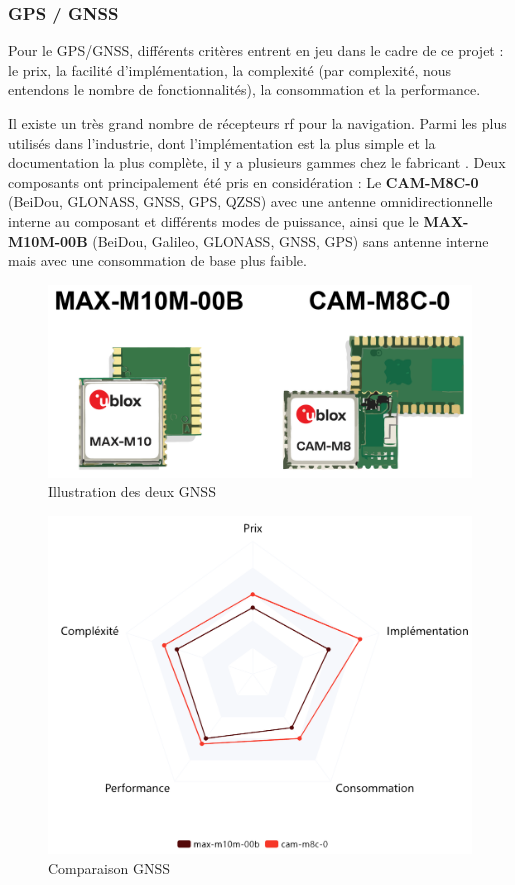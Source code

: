 \clearpage

\subsubsection{GPS / GNSS}
Pour le \gls{GPS}/\gls{GNSS}, différents critères entrent en jeu dans le cadre de ce projet : le prix, la facilité d'implémentation, la complexité (par complexité, nous entendons le nombre de fonctionnalités), la consommation et la performance.

Il existe un très grand nombre de récepteurs \gls{rf} pour la navigation. Parmi les plus utilisés dans l'industrie, dont l'implémentation est la plus simple et la documentation la plus complète, il y a plusieurs gammes chez le fabricant .
Deux composants ont principalement été pris en considération :
Le \textbf{CAM-M8C-0} (BeiDou, GLONASS, GNSS, GPS, QZSS) avec une antenne omnidirectionnelle interne au composant et différents modes de puissance, ainsi que le \textbf{MAX-M10M-00B} (BeiDou, Galileo, GLONASS, GNSS, GPS) sans antenne interne mais avec une consommation de base plus faible.

\begin{figure}[h]
	\centering
	\includegraphics[width=0.6\linewidth]{../figures/pre_etude/img_gnss}
	\caption{Illustration des deux GNSS}
	\label{fig:imggnss}
\end{figure}


\begin{figure}[h]
	\centering
	\includegraphics[width=0.65\linewidth]{../figures/pre_etude/Comp_GNSS}
	\caption{Comparaison GNSS}
	\label{fig:compgnss}
\end{figure}

